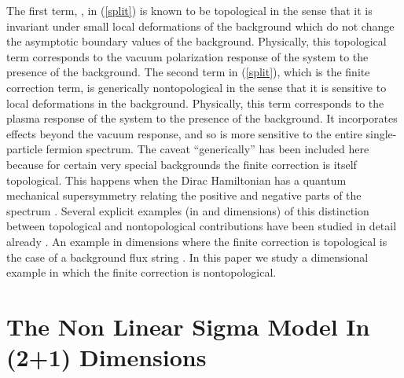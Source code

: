 \documentclass[a4paper,prd]{revtex4}
\begin{document}
The first term, \coordHE{}, in (\ref{split}) is known to be topological 
in the sense that it is invariant under small local deformations of the background
which do not change the asymptotic boundary values of the background. Physically,
this topological term corresponds to the vacuum polarization response of the system
to the presence of the background. The second term in (\ref{split}), which is the
finite \coordHE{} correction term, is generically nontopological in the sense that it is
sensitive to local deformations in the background. Physically, this term corresponds
to the plasma response of the system to the presence of the background. It
incorporates effects beyond the vacuum response, and so is more sensitive to the
entire single-particle fermion spectrum. The caveat ``generically'' has been included
here because for certain very special backgrounds the finite \coordHE{} correction is itself
topological. This happens when the Dirac Hamiltonian has a quantum 
mechanical supersymmetry
relating the positive and negative parts of the spectrum \cite{dr,leipzig}. Several
explicit examples (in \coordHE{} and \coordHE{} dimensions) of this distinction
between topological and nontopological contributions have been studied
in detail already \cite{ad,dr,leipzig}. 
An example in \coordHE{} dimensions where the finite \coordHE{} correction is
topological is the case of a background flux string
\cite{cesar,cp,monopole}. In this paper we study a
\coordHE{} dimensional example in which the finite \coordHE{} correction is
nontopological. 

\section{The Non Linear Sigma Model In (2+1) Dimensions}
\end{document}
